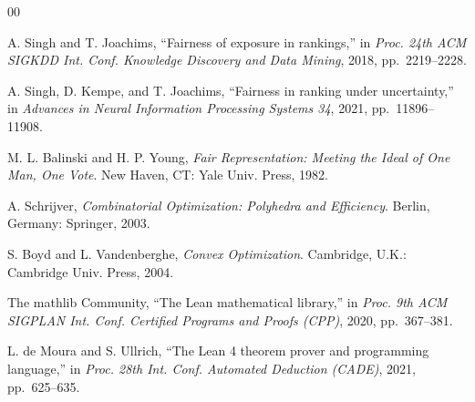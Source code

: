 \begin{thebibliography}{00}

 A. Singh and T. Joachims, ``Fairness of exposure in rankings,'' in
\emph{Proc. 24th ACM SIGKDD Int. Conf. Knowledge Discovery and Data Mining}, 2018,
pp.~2219--2228.

 A. Singh, D. Kempe, and T. Joachims, ``Fairness in ranking under
uncertainty,'' in \emph{Advances in Neural Information Processing Systems 34}, 2021,
pp.~11896--11908.

 M. L. Balinski and H. P. Young, \emph{Fair Representation: Meeting
the Ideal of One Man, One Vote}. New Haven, CT: Yale Univ. Press, 1982.

 A. Schrijver, \emph{Combinatorial Optimization: Polyhedra and
Efficiency}. Berlin, Germany: Springer, 2003.

 S. Boyd and L. Vandenberghe, \emph{Convex Optimization}. Cambridge,
U.K.: Cambridge Univ. Press, 2004.

 The mathlib Community, ``The Lean mathematical library,'' in
\emph{Proc. 9th ACM SIGPLAN Int. Conf. Certified Programs and Proofs (CPP)}, 2020,
pp.~367--381.

 L. de Moura and S. Ullrich, ``The Lean 4 theorem prover and
programming language,'' in \emph{Proc. 28th Int. Conf. Automated Deduction (CADE)}, 2021,
pp.~625--635.

\end{thebibliography}


